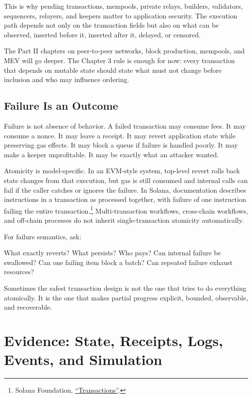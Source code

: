 This is why pending transactions, mempools, private relays, builders, validators, sequencers, relayers, and keepers matter to application security. The execution path depends not only on the transaction fields but also on what can be observed, inserted before it, inserted after it, delayed, or censored.

The Part II chapters on peer-to-peer networks, block production, mempools, and MEV will go deeper. The Chapter 3 rule is enough for now: every transaction that depends on mutable state should state what must not change before inclusion and who may influence ordering.

\subsection{Failure Is an Outcome}

Failure is not absence of behavior. A failed transaction may consume fees. It may consume a nonce. It may leave a receipt. It may revert application state while preserving gas effects. It may block a queue if failure is handled poorly. It may make a keeper unprofitable. It may be exactly what an attacker wanted.

Atomicity is model-specific. In an EVM-style system, top-level revert rolls back state changes from that execution, but gas is still consumed and internal calls can fail if the caller catches or ignores the failure. In Solana, documentation describes instructions in a transaction as processed together, with failure of one instruction failing the entire transaction.\footnote{Solana Foundation, \href{https://solana.com/docs/core/transactions}{``Transactions''}.} Multi-transaction workflows, cross-chain workflows, and off-chain processes do not inherit single-transaction atomicity automatically.

For failure semantics, ask:

\begin{codeblock}
What exactly reverts?
What persists?
Who pays?
Can internal failure be swallowed?
Can one failing item block a batch?
Can repeated failure exhaust resources?
\end{codeblock}

Sometimes the safest transaction design is not the one that tries to do everything atomically. It is the one that makes partial progress explicit, bounded, observable, and recoverable.

\section{Evidence: State, Receipts, Logs, Events, and Simulation}

